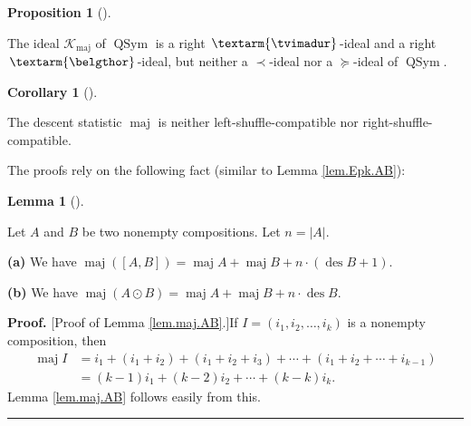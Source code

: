 \documentclass[numbers=enddot,12pt,final,onecolumn,notitlepage]{scrartcl}%
\theoremstyle{definition}
\newtheorem{lem}[theo]{Lemma}
\newenvironment{lemma}[1][]
{\begin{lem}[#1]\begin{leftbar}}
{\end{leftbar}\end{lem}}
\newtheorem{prop}[theo]{Proposition}
\newenvironment{proposition}[1][]
{\begin{prop}[#1]\begin{leftbar}}
{\end{leftbar}\end{prop}}
\newtheorem{coro}[theo]{Corollary}
\newenvironment{corollary}[1][]
{\begin{coro}[#1]\begin{leftbar}}
{\end{leftbar}\end{coro}}
\newenvironment{proof}[1][Proof]{\noindent\textbf{#1.} }{\ \rule{0.5em}{0.5em}}
\newcommand{\tvi}{\left. \textarm{\tvimadur} \right.}
\newcommand{\bel}{\left. \textarm{\belgthor} \right.}
\begin{document}
\begin{proposition}
\label{prop.maj.dend}The ideal $\mathcal{K}_{\operatorname*{maj}}$ of
$\operatorname*{QSym}$ is a right $\tvi$-ideal and a right $\bel$-ideal, but
neither a $\left.  \prec\right.  $-ideal nor a $\left.  \succeq\right.
$-ideal of $\operatorname*{QSym}$.
\end{proposition}

\begin{corollary}
\label{cor.dendri.maj}The descent statistic $\operatorname*{maj}$ is neither
left-shuffle-compatible nor right-shuffle-compatible.
\end{corollary}

The proofs rely on the following fact (similar to Lemma \ref{lem.Epk.AB}):

\begin{lemma}
\label{lem.maj.AB}Let $A$ and $B$ be two nonempty compositions. Let
$n=\left\vert A\right\vert $.

\textbf{(a)} We have $\operatorname*{maj}\left(  \left[  A,B\right]  \right)
=\operatorname*{maj}A+\operatorname*{maj}B+n\cdot\left(  \operatorname*{des}%
B+1\right)  $.

\textbf{(b)} We have $\operatorname*{maj}\left(  A\odot B\right)
=\operatorname*{maj}A+\operatorname*{maj}B+n\cdot\operatorname*{des}B$.
\end{lemma}

\begin{proof}
[Proof of Lemma \ref{lem.maj.AB}.]If $I=\left(  i_{1},i_{2},\ldots
,i_{k}\right)  $ is a nonempty composition, then
\begin{align*}
\operatorname*{maj}I  &  =i_{1}+\left(  i_{1}+i_{2}\right)  +\left(
i_{1}+i_{2}+i_{3}\right)  +\cdots+\left(  i_{1}+i_{2}+\cdots+i_{k-1}\right) \\
&  =\left(  k-1\right)  i_{1}+\left(  k-2\right)  i_{2}+\cdots+\left(
k-k\right)  i_{k}.
\end{align*}
Lemma \ref{lem.maj.AB} follows easily from this.
\end{proof}
\end{document}
